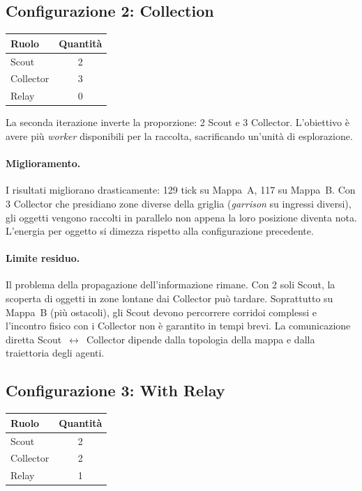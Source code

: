 \subsection{Configurazione 2: Collection}

\begin{center}
\begin{tabular}{lc}
\toprule
\textbf{Ruolo} & \textbf{Quantità} \\
\midrule
Scout     & 2 \\
Collector & 3 \\
Relay     & 0 \\
\bottomrule
\end{tabular}
\end{center}

La seconda iterazione inverte la proporzione: 2 Scout e 3 Collector. L'obiettivo è avere più \emph{worker} disponibili per la raccolta, sacrificando un'unità di esplorazione.

\paragraph{Miglioramento.} I risultati migliorano drasticamente: 129 tick su Mappa~A, 117 su Mappa~B. Con 3 Collector che presidiano zone diverse della griglia (\emph{garrison} su ingressi diversi), gli oggetti vengono raccolti in parallelo non appena la loro posizione diventa nota. L'energia per oggetto si dimezza rispetto alla configurazione precedente.

\paragraph{Limite residuo.} Il problema della propagazione dell'informazione rimane. Con 2 soli Scout, la scoperta di oggetti in zone lontane dai Collector può tardare. Soprattutto su Mappa~B (più ostacoli), gli Scout devono percorrere corridoi complessi e l'incontro fisico con i Collector non è garantito in tempi brevi. La comunicazione diretta Scout~$\leftrightarrow$~Collector dipende dalla topologia della mappa e dalla traiettoria degli agenti.

\subsection{Configurazione 3: With Relay}

\begin{center}
\begin{tabular}{lc}
\toprule
\textbf{Ruolo} & \textbf{Quantità} \\
\midrule
Scout     & 2 \\
Collector & 2 \\
Relay     & 1 \\
\bottomrule
\end{tabular}
\end{center}

